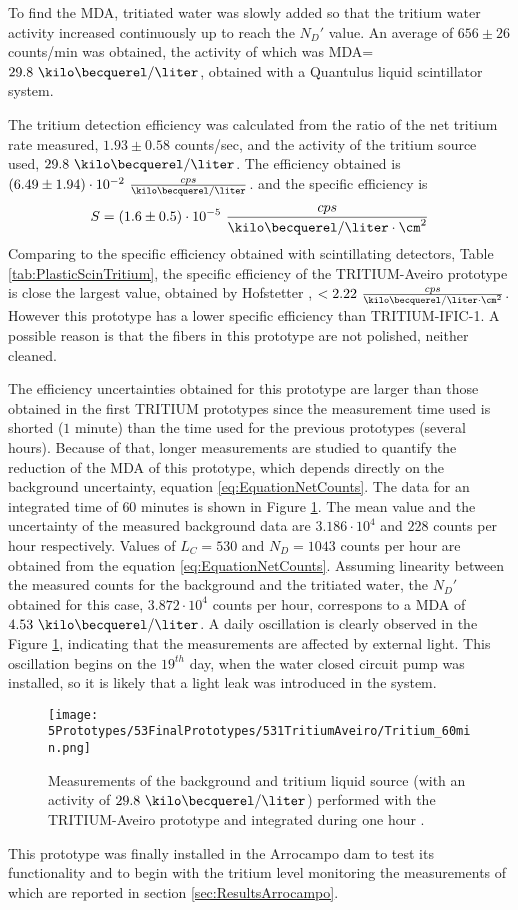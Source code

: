 To find the MDA, tritiated water was slowly added  so that the tritium water activity increased continuously up to reach the $N_D'$ value. An average of $656 \pm 26$ counts/min was obtained, the activity of which was MDA=$29.8~\kilo\becquerel/\liter$, obtained with a Quantulus liquid scintillator system.

The tritium detection efficiency was calculated from the ratio of the net tritium rate measured, $1.93 \pm 0.58$ counts/sec, and the activity of the tritium source used, $29.8~\kilo\becquerel/\liter$. The efficiency obtained is $(6.49 \pm 1.94)\cdot{} 10^{-2}~\frac{cps}{\kilo\becquerel/\liter}$.  and the specific efficiency is
$$S=(1.6 \pm 0.5)\cdot{} 10^{-5}~\frac{cps}{\kilo\becquerel/\liter \cdot{} \cm^{2}}$$ 
Comparing to the specific efficiency obtained with scintillating detectors, Table \ref{tab:PlasticScinTritium}, the specific efficiency of the TRITIUM-Aveiro prototype is close the largest value, obtained by Hofstetter \cite{Hofstetter1, Hofstetter2}, $<2.22~\frac{cps}{\kilo\becquerel/\liter \cdot{} \cm^{2}}$. However this prototype has a lower specific efficiency than TRITIUM-IFIC-1. A possible reason is that the fibers in this prototype are not polished, neither cleaned. 

The efficiency uncertainties obtained for this prototype are larger than those obtained in the first TRITIUM prototypes since the measurement time used is shorted ($1$ minute) than the time used for the previous prototypes (several hours). Because of that, longer measurements are studied to quantify the reduction of the MDA of this prototype, which depends directly on the background uncertainty, equation \ref{eq:EquationNetCounts}. The data for an integrated time of $60$ minutes is shown in Figure \ref{fig:Tritium60min}. The mean value and the uncertainty of the measured background data are $3.186 \cdot{} 10^{4}$ and $228$ counts per hour respectively. Values of $L_C=530$ and $N_D=1043$ counts per hour are obtained from the equation \ref{eq:EquationNetCounts}. Assuming linearity between the measured counts for the background and the tritiated water, the $N_D'$ obtained for this case, $3.872\cdot{}10^4$ counts per hour,  correspons to a MDA of $4.53~\kilo\becquerel/\liter$. A daily oscillation is clearly observed in the Figure \ref{fig:Tritium60min}, indicating that the measurements are affected by external light. This oscillation begins on the $19^{th}$ day, when the water closed circuit pump was installed, so it is likely that a light leak was introduced in the system.

\begin{figure}[h]
\centering
\texttt{[image: 5Prototypes/53FinalPrototypes/531TritiumAveiro/Tritium\_60min.png]}
\caption{Measurements of the background and tritium liquid source (with an activity of $29.8~\kilo\becquerel/\liter$) performed with the TRITIUM-Aveiro prototype and integrated during one hour \cite{ExperimentalPaperCarlos}.\label{fig:Tritium60min}}
\end{figure}

This prototype was finally installed in the Arrocampo dam to test its functionality and to begin with the tritium level monitoring the measurements of which are reported in section \ref{sec:ResultsArrocampo}.
